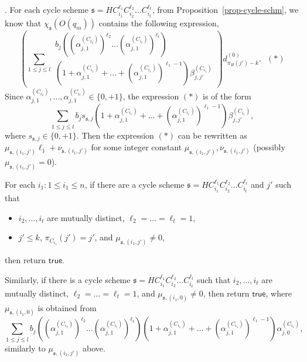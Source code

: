 \documentclass[runningheads,a4paper]{llncs}
\def\schm{{\mathfrak{s} }}
\newcommand\ltrue{\mathsf{true}}
\begin{document}
\smallskip

. For each cycle scheme $\schm=HC_{i_1}^{\ell_1} C_{i_2}^{\ell_2} \dots C_{i_t}^{\ell_t}$, from Proposition~\ref{prop-cycle-schm}, we know that $\chi_{\schm}(O(q_m))$ contains the following expression,
\[
\left(\sum \limits_{1 \le j \le l} 
\begin{array}{l}
b_j \left((\alpha^{(C_{i_2})}_{j,1})^{\ell_2} \dots (\alpha^{(C_{i_t})}_{j,1})^{\ell_t}\right) \\
\left(1+\alpha^{(C_{i_1})}_{j,1} + \dots + (\alpha^{(C_{i_1})}_{j,1})^{\ell_1-1} \right) \beta^{(C_{i_1})}_{j,j'}
\end{array}
\right) d^{(0)}_{\pi_H(j')-k}. \ \ \  (\ast)
\]
Since $\alpha^{(C_{i_2})}_{j,1}, \dots, \alpha^{(C_{i_t})}_{j,1} \in \{0,+1\}$, the expression $(\ast)$ is of the form 
\[
\sum \limits_{1 \le j \le l} b_j  s_{\schm,j} \left(1+\alpha^{(C_{i_1})}_{j,1} + \dots +(\alpha^{(C_{i_1})}_{j,1})^{\ell_1-1} \right) \beta^{(C_{i_1})}_{j,j'},
\]
where $s_{\schm,j} \in \{0,+1\}$. Then the expression $(\ast)$ can be rewritten as $\mu_{\schm, (i_1,j')} \ell_1 + \nu_{\schm, (i_1,j')}$ for some integer constant $\mu_{\schm, (i_1,j')},\nu_{\schm, (i_1,j')}$ (possibly $\mu_{\schm, (i_1,j')}=0$). 

For each $i_1: 1 \le i_1 \le n$, if there are a cycle scheme $\schm=HC_{i_1}^{\ell_1} C_{i_2}^{\ell_2} \dots C_{i_t}^{\ell_t}$  and $j'$ such that 
\begin{itemize}
\item $i_2,\dots,i_t$ are mutually distinct, $\ell_2 = \dots = \ell_t = 1$, 
%
\item $j' \le k$, $\pi_{C_{i_1}}(j')=j'$, and $\mu_{\schm,(i_1,j')} \neq 0$, 
\end{itemize}
then return $\ltrue$.

Similarly, if there is a cycle scheme $\schm=HC_{i_1}^{\ell_1} C_{i_2}^{\ell_2} \dots C_{i_t}^{\ell_t}$ such that 
$i_2,\dots,i_t$ are mutually distinct, $\ell_2 = \dots = \ell_t = 1$, 
%
and $\mu_{\schm,(i_1,0)} \neq 0$, 
%
then return $\ltrue$, where $\mu_{\schm,(i_1,0)}$ is obtained from 
\[
\sum \limits_{1 \le j \le l} 
b_j \left((\alpha^{(C_{i_2})}_{j,1})^{\ell_2} \dots (\alpha^{(C_{i_t})}_{j,1})^{\ell_t}\right) 
\left(1+\alpha^{(C_{i_1})}_{j,1} + \dots + (\alpha^{(C_{i_1})}_{j,1})^{\ell_1-1} \right) \alpha^{(C_{i_1})}_{j,0},
\]
similarly to $\mu_{\schm,(i_1,j')}$ above.
\end{document}
